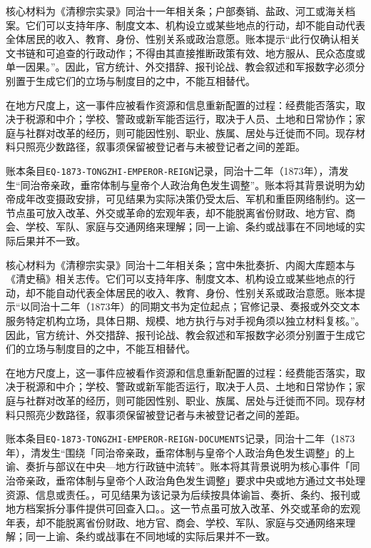 核心材料为《清穆宗实录》同治十一年相关条；户部奏销、盐政、河工或海关档案。它们可以支持年序、制度文本、机构设立或某些地点的行动，却不能自动代表全体居民的收入、教育、身份、性别关系或政治意愿。账本提示“此行仅确认相关文书链和可追查的行政动作；不得由其直接推断政策有效、地方服从、民众态度或单一因果。”。因此，官方统计、外交措辞、报刊论战、教会叙述和军报数字必须分别置于生成它们的立场与制度目的之中，不能互相替代。

在地方尺度上，这一事件应被看作资源和信息重新配置的过程：经费能否落实，取决于税源和中介；学校、警政或新军能否运行，取决于人员、土地和日常协作；家庭与社群对改革的经历，则可能因性别、职业、族属、居处与迁徙而不同。现存材料只照亮少数路径，叙事须保留被登记者与未被登记者之间的差距。

账本条目\texttt{EQ-1873-TONGZHI-EMPEROR-REIGN}记录，同治十二年（1873年），清发生“同治帝亲政，垂帘体制与皇帝个人政治角色发生调整”。账本将其背景说明为幼帝成年改变摄政安排，可见结果为实际决策仍受太后、军机和重臣网络制约。这一节点虽可放入改革、外交或革命的宏观年表，却不能脱离省份财政、地方官、商会、学校、军队、家庭与交通网络来理解；同一上谕、条约或战事在不同地域的实际后果并不一致。

核心材料为《清穆宗实录》同治十二年相关条；宫中朱批奏折、内阁大库题本与《清史稿》相关志传。它们可以支持年序、制度文本、机构设立或某些地点的行动，却不能自动代表全体居民的收入、教育、身份、性别关系或政治意愿。账本提示“以同治十二年（1873年）的同期文书为定位起点；官修记录、奏报或外交文本服务特定机构立场，具体日期、规模、地方执行与对手视角须以独立材料复核。”。因此，官方统计、外交措辞、报刊论战、教会叙述和军报数字必须分别置于生成它们的立场与制度目的之中，不能互相替代。

在地方尺度上，这一事件应被看作资源和信息重新配置的过程：经费能否落实，取决于税源和中介；学校、警政或新军能否运行，取决于人员、土地和日常协作；家庭与社群对改革的经历，则可能因性别、职业、族属、居处与迁徙而不同。现存材料只照亮少数路径，叙事须保留被登记者与未被登记者之间的差距。

账本条目\texttt{EQ-1873-TONGZHI-EMPEROR-REIGN-DOCUMENTS}记录，同治十二年（1873年），清发生“围绕「同治帝亲政，垂帘体制与皇帝个人政治角色发生调整」的上谕、奏折与部议在中央—地方行政链中流转”。账本将其背景说明为核心事件「同治帝亲政，垂帘体制与皇帝个人政治角色发生调整」要求中央或地方通过文书处理资源、信息或责任。，可见结果为该记录为后续按具体谕旨、奏折、条约、报刊或地方档案拆分事件提供可回查入口。。这一节点虽可放入改革、外交或革命的宏观年表，却不能脱离省份财政、地方官、商会、学校、军队、家庭与交通网络来理解；同一上谕、条约或战事在不同地域的实际后果并不一致。

